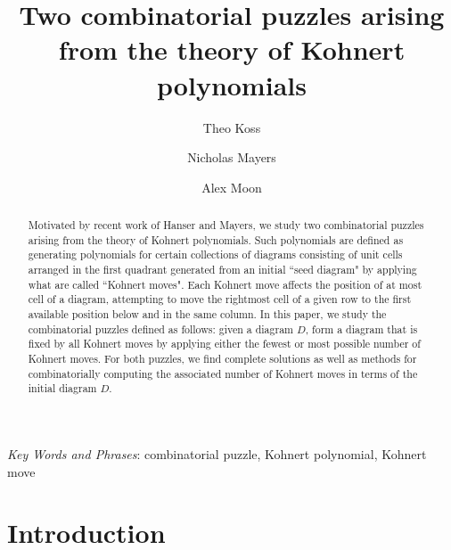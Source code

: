 \documentclass[letterpaper,10pt]{article}
\newcommand{\rn}[1]{{\color{red} #1}}
\begin{document}
\title{Two combinatorial puzzles arising from the theory of Kohnert polynomials}

\author[*]{Theo Koss}

\author[**]{Nicholas Mayers}

\author[***]{Alex Moon}






\maketitle

\bigskip
\begin{abstract} 
\noindent
Motivated by recent work of Hanser and Mayers, we study two combinatorial puzzles arising from the theory of Kohnert polynomials. Such polynomials are defined as generating polynomials for certain collections of diagrams consisting of unit cells arranged in the first quadrant generated from an initial ``seed diagram" by applying what are called ``Kohnert moves". Each Kohnert move affects the position of at most cell of a diagram, attempting to move the rightmost cell of a given row to the first available position below and in the same column. In this paper, we study the combinatorial puzzles defined as follows: given a %
diagram $D$, form a diagram that is fixed by all Kohnert moves by applying either the fewest or most possible number of Kohnert moves. For both puzzles, we find complete solutions as well as methods for combinatorially computing the associated number of Kohnert moves in terms of the initial diagram $D$. 
\end{abstract}

\noindent
\textit{Key Words and Phrases}: combinatorial puzzle, Kohnert polynomial, Kohnert move

\section{Introduction}
\end{document}
